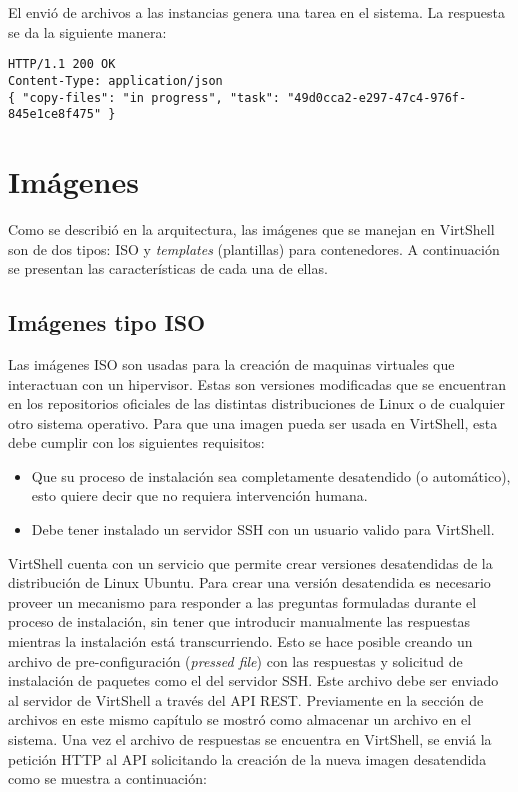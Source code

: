 \vspace{5mm}

El envió de archivos a las instancias genera una tarea en el sistema. La respuesta se da la siguiente manera:

\vspace{5mm}

\begin{lstlisting}[style=json, caption=Ejemplo de respuesta HTTP para el envio de archivos]
HTTP/1.1 200 OK
Content-Type: application/json
{ "copy-files": "in progress", "task": "49d0cca2-e297-47c4-976f-845e1ce8f475" }
\end{lstlisting}

\section{Imágenes}
Como se describió en la arquitectura, las imágenes que se manejan en VirtShell son de dos tipos: ISO y \emph{templates} (plantillas) para contenedores. A continuación se presentan las características de cada una de ellas.

\subsection{Imágenes tipo ISO}
Las imágenes ISO son usadas para la creación de maquinas virtuales que interactuan con un hipervisor. Estas son versiones modificadas que se encuentran en los repositorios oficiales de las distintas distribuciones de Linux o de cualquier otro sistema operativo. Para que una imagen pueda ser usada en VirtShell, esta debe cumplir con los siguientes requisitos: 
\begin{itemize}
\item Que su proceso de instalación sea completamente desatendido (o automático), esto quiere decir que no requiera intervención humana.
\item Debe tener instalado un servidor SSH con un usuario valido para VirtShell.
\end{itemize}

VirtShell cuenta con un servicio que permite crear versiones desatendidas de la distribución de Linux Ubuntu. Para crear una versión desatendida es necesario proveer un mecanismo para responder a las preguntas formuladas durante el proceso de instalación, sin tener que introducir manualmente las respuestas mientras la instalación está transcurriendo. Esto se hace posible creando un archivo de pre-configuración (\emph{pressed file}) con las respuestas y solicitud de instalación de paquetes como el del servidor SSH. Este archivo debe ser enviado al servidor de VirtShell a través del API REST. Previamente en la sección de archivos en este mismo capítulo se mostró como almacenar un archivo en el sistema. Una vez el archivo de respuestas se encuentra en VirtShell, se enviá la petición HTTP al API solicitando la creación de la nueva imagen desatendida como se muestra a continuación:

